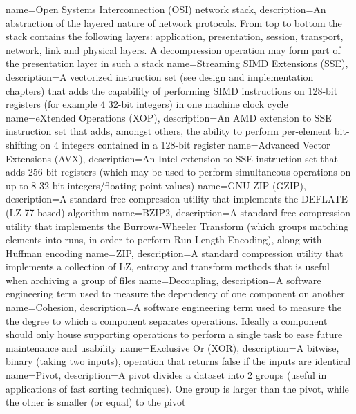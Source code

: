  {
  name={Open Systems Interconnection (OSI) network stack},
  description={An abstraction of the layered nature of network protocols. From top to bottom the stack contains the following layers: application, presentation, session,
  transport, network, link and physical layers. A decompression operation may form part of the presentation layer in such a stack}
 }
 {
  name={Streaming SIMD Extensions (SSE)},
  description={A vectorized instruction set (see design and implementation chapters) that adds the capability of performing SIMD instructions on 128-bit registers (for example
  4 32-bit integers) in one machine clock cycle}
 }
 {
  name={eXtended Operations (XOP)},
  description={An AMD extension to SSE instruction set that adds, amongst others, the ability to perform per-element bit-shifting on 4 integers contained in a 128-bit 
  register}
 }
 {
  name={Advanced Vector Extensions (AVX)},
  description={An Intel extension to SSE instruction set that adds 256-bit registers (which may be used to perform simultaneous operations on up to 8 32-bit 
  integers/floating-point values)}
 }
 {
  name={GNU ZIP (GZIP)},
  description={A standard free compression utility that implements the DEFLATE (LZ-77 based) algorithm}
 }
 {
  name={BZIP2},
  description={A standard free compression utility that implements the Burrows-Wheeler Transform (which groups matching elements into runs, in order to perform
  Run-Length Encoding), along with Huffman encoding}
 }
 {
  name={ZIP},
  description={A standard compression utility that implements a collection of LZ, entropy and transform methods that is useful when archiving a group of files}
 }
 {
  name={Decoupling},
  description={A software engineering term used to measure the dependency of one component on another}
 }
 {
  name={Cohesion},
  description={A software engineering term used to measure the the degree to which a component separates operations. Ideally a component should only house supporting
  operations to perform a single task to ease future maintenance and usability}
 }
 {
  name={Exclusive Or (XOR)},
  description={A bitwise, binary (taking two inputs), operation that returns false if the inputs are identical}
 }
 {
  name={Pivot},
  description={A pivot divides a dataset into 2 groups (useful in applications of fast sorting techniques). One group is larger than the pivot, while the other is smaller (or equal)
  to the pivot}
 }

